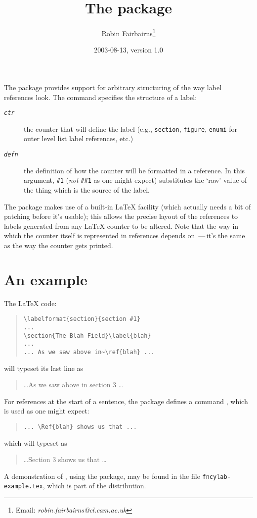 \documentclass[a4paper]{article}
\begin{document}
\title{The  package}
\author{Robin Fairbairns\thanks{Email:
    \emph{robin.fairbairns@cl.cam.ac.uk}}}
\date{2003-08-13, version 1.0}
\maketitle

The package provides support for arbitrary structuring of the way
label references look.  The command 
specifies the structure of a label:
\begin{description}
\item[\emph{\texttt{ctr}}] the counter that will define the label
  (e.g., \texttt{section}, \texttt{figure}, \texttt{enumi} for outer
  level list label references, etc.)
\item[\emph{\texttt{defn}}] the definition of how the counter will be
  formatted in a reference.  In this argument, \texttt{\#1}
  (\emph{not} \texttt{\#\#1} as one might expect) substitutes the
  `raw' value of the thing which is the source of the label.
\end{description}

The package makes use of a built-in LaTeX facility (which actually
needs a bit of patching before it's usable); this allows the precise
layout of the references to labels generated from any LaTeX counter
to be altered.  Note that the way in which the counter itself is
represented in references depends on \,---\,it's
the same as the way the counter gets printed.

\section{An example}

The \LaTeX{} code:
\begin{quote}
\begin{verbatim}
\labelformat{section}{section #1}
...
\section{The Blah Field}\label{blah}
...
... As we saw above in~\ref{blah} ...
\end{verbatim}
\end{quote}
will typeset its last line as
\begin{quote}
  \dots\@ As we saw above in section 3 \dots
\end{quote}

For references at the start of a sentence, the package defines a
command , which is used as one might expect:
\begin{quote}
\begin{verbatim}
... \Ref{blah} shows us that ...
\end{verbatim}
\end{quote}
which will typeset as
\begin{quote}
  \dots\@ Section 3 shows us that \dots
\end{quote}

A demonstration of , using the 
package, may be found in the file \texttt{fncylab-example.tex}, which
is part of the distribution.
\end{document}
